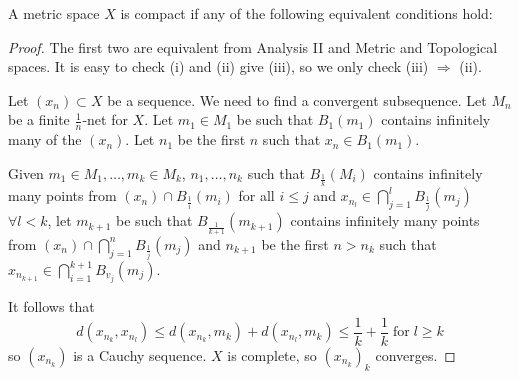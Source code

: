 \documentclass{article}
\begin{document}
\begin{prop}
    A metric space $X$ is compact if any of the following equivalent conditions hold:
\end{prop}


\begin{proof}
    The first two are equivalent from Analysis II and Metric and Topological spaces. It is easy to check (i) and (ii) give (iii), so we only check (iii) $\Rightarrow$ (ii).

    Let $(x_n) \subset X$ be a sequence. We need to find a convergent subsequence. Let $M_n$ be a finite $\frac{1}{n}$-net for $X$.
    Let $m_1 \in M_1$ be such that $B_1(m_1)$ contains infinitely many of the $(x_n)$. Let $n_1$ be the first $n$ such that $x_n \in B_1(m_1)$.

    Given $m_1 \in M_1, \dotsc, m_k \in M_k$, $n_1, \dotsc, n_k$ such that $B_\frac{1}{k}(M_i)$ contains infinitely many points from $(x_n) \cap B_\frac{1}{i}(m_i)$ for all $i \leq j$ and $x_{n_l} \in \bigcap_{j=1}^l B_\frac{1}{j}(m_j)$ $\forall l < k$,
    let $m_{k+1}$ be such that $B_\frac{1}{k+1}(m_{k+1})$ contains infinitely many points from $(x_n) \cap \bigcap_{j=1}^n B_\frac{1}{j} (m_j)$ and $n_{k+1}$ be the first $n > n_k$ such that $x_{n_{k+1}} \in \bigcap_{i=1}^{k+1} B_{v_j} (m_j)$.

    It follows that
    \begin{equation*}
        d(x_{n_k}, x_{n_l}) \leq d(x_{n_k}, m_k) + d(x_{n_l}, m_k) \leq \frac{1}{k} + \frac{1}{k} \; \text{for} \; l \geq k
    \end{equation*}
    so $(x_{n_k})$ is a Cauchy sequence. $X$ is complete, so $(x_{n_k})_k$ converges.
\end{proof}

\end{document}
